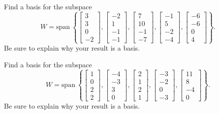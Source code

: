 \documentclass{article}
\begin{document}
\begin{exerciseStatement}
    Find a basis for the subspace
\[W=\mathrm{span}\ \left\{\left[\begin{array}{r}
3 \\
3 \\
0 \\
-2
\end{array}\right] , \left[\begin{array}{r}
-2 \\
1 \\
-1 \\
-1
\end{array}\right] , \left[\begin{array}{r}
7 \\
10 \\
-1 \\
-7
\end{array}\right] , \left[\begin{array}{r}
-1 \\
5 \\
-2 \\
-4
\end{array}\right] , \left[\begin{array}{r}
-6 \\
-6 \\
0 \\
4
\end{array}\right]\right\}.\]
 Be sure to explain why your result is a basis.


  
\end{exerciseStatement}

\begin{exerciseStatement}
    Find a basis for the subspace
\[W=\mathrm{span}\ \left\{\left[\begin{array}{r}
1 \\
0 \\
2 \\
2
\end{array}\right] , \left[\begin{array}{r}
-4 \\
-3 \\
3 \\
0
\end{array}\right] , \left[\begin{array}{r}
2 \\
1 \\
2 \\
1
\end{array}\right] , \left[\begin{array}{r}
-3 \\
-2 \\
0 \\
-3
\end{array}\right] , \left[\begin{array}{r}
11 \\
8 \\
-4 \\
0
\end{array}\right]\right\}.\]
 Be sure to explain why your result is a basis.


  
\end{exerciseStatement}
\end{document}

